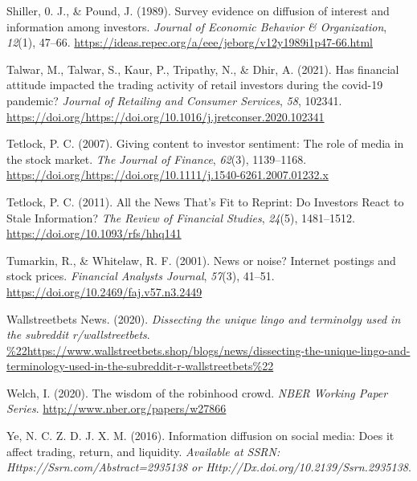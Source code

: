 \documentclass[12pt,]{article}
\begin{document}
\leavevmode\hypertarget{ref-shiller1989}{}%
Shiller, 0. J., \& Pound, J. (1989). Survey evidence on diffusion of
interest and information among investors. \emph{Journal of Economic
Behavior \& Organization}, \emph{12}(1), 47--66.
\url{https://ideas.repec.org/a/eee/jeborg/v12y1989i1p47-66.html}

\leavevmode\hypertarget{ref-talwar2021}{}%
Talwar, M., Talwar, S., Kaur, P., Tripathy, N., \& Dhir, A. (2021). Has
financial attitude impacted the trading activity of retail investors
during the covid-19 pandemic? \emph{Journal of Retailing and Consumer
Services}, \emph{58}, 102341.
\url{https://doi.org/https://doi.org/10.1016/j.jretconser.2020.102341}

\leavevmode\hypertarget{ref-tetlock2007}{}%
Tetlock, P. C. (2007). Giving content to investor sentiment: The role of
media in the stock market. \emph{The Journal of Finance}, \emph{62}(3),
1139--1168.
\url{https://doi.org/https://doi.org/10.1111/j.1540-6261.2007.01232.x}

\leavevmode\hypertarget{ref-tetlock2011}{}%
Tetlock, P. C. (2011). All the News That's Fit to Reprint: Do Investors
React to Stale Information? \emph{The Review of Financial Studies},
\emph{24}(5), 1481--1512. \url{https://doi.org/10.1093/rfs/hhq141}

\leavevmode\hypertarget{ref-tumarkin2001}{}%
Tumarkin, R., \& Whitelaw, R. F. (2001). News or noise? Internet
postings and stock prices. \emph{Financial Analysts Journal},
\emph{57}(3), 41--51. \url{https://doi.org/10.2469/faj.v57.n3.2449}

\leavevmode\hypertarget{ref-wsbshop}{}%
Wallstreetbets News. (2020). \emph{Dissecting the unique lingo and
terminolgy used in the subreddit r/wallstreetbets}.
\url{\%22https://www.wallstreetbets.shop/blogs/news/dissecting-the-unique-lingo-and-terminology-used-in-the-subreddit-r-wallstreetbets\%22}

\leavevmode\hypertarget{ref-welch2020}{}%
Welch, I. (2020). The wisdom of the robinhood crowd. \emph{NBER Working
Paper Series}. \url{http://www.nber.org/papers/w27866}

\leavevmode\hypertarget{ref-chawla2016}{}%
Ye, N. C. Z. D. J. X. M. (2016). Information diffusion on social media:
Does it affect trading, return, and liquidity. \emph{Available at SSRN:
Https://Ssrn.com/Abstract=2935138 or
Http://Dx.doi.org/10.2139/Ssrn.2935138}.





\newpage
\singlespacing 
\end{document}
